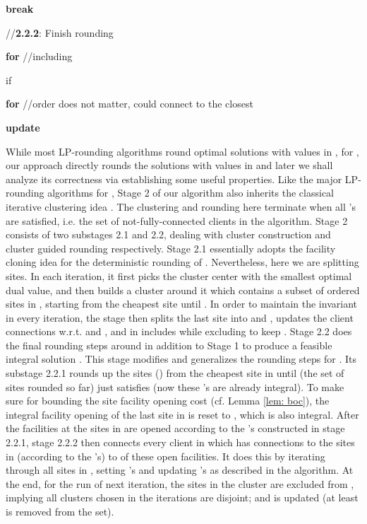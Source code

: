 \documentclass[10pt]{llncs}
\begin{document}
\begin{algorithm}[H]
\qquad{}\qquad{}\qquad{}\textbf{break}\medskip{}


\qquad{}//\textbf{2.2.2}: Finish rounding 

\qquad{}\textbf{for}  //including 

\qquad{}\qquad{}if 

\qquad{}\qquad{}\qquad{}\textbf{for  }//order
does not matter, could connect to the closest

\qquad{}\qquad{}\qquad{}\qquad{}

\qquad{}\qquad{}\qquad{}\qquad{}

\qquad{}\qquad{}

\qquad{}\textbf{update }
\end{algorithm}


While most LP-rounding algorithms round optimal solutions with values
in , for , our approach directly rounds
the solutions with values in  and later
we shall analyze its correctness via establishing some useful properties.
Like the major LP-rounding algorithms \cite{Sviridenko02improved1.58,jaroslaw2010optimal,jaroslaw2012lp,Li2011}
for , Stage 2 of our algorithm also inherits the classical iterative
clustering idea \cite{Shmoys97FL,Chudak0312e}. The clustering and
rounding here terminate when all 's are satisfied, i.e.
the set of not-fully-connected clients 
in the algorithm. Stage 2 consists of two substages 2.1 and 2.2, dealing
with cluster construction and cluster guided rounding respectively.
Stage 2.1 essentially adopts the facility cloning idea \cite{Swamy08FTFL2.076}
for the deterministic rounding of . Nevertheless, here we are
splitting sites. In each iteration, it first picks the cluster center
 with the smallest optimal dual value, and then builds a cluster
 around it which contains a subset of ordered sites
in , starting from the cheapest site until .
In order to maintain the invariant 
in every iteration, the stage then splits the last site 
into  and , updates the client connections w.r.t.
 and , and in  includes  while
excluding  to keep .
Stage 2.2 does the final rounding steps around  in addition
to Stage 1 to produce a feasible integral solution .
This stage modifies and generalizes the rounding steps for .
Its substage 2.2.1 rounds up the sites ()
from the cheapest site in  until 
(the set of sites rounded so far) just satisfies \textbf{}
(now these 's are already integral). To make sure 
for bounding the site facility opening cost (cf. Lemma \ref{lem: boc}),
the integral facility opening  of the last site  in 
is reset to ,
which is also integral. After the facilities at the sites in 
are opened according to the 's constructed in stage 2.2.1,
stage 2.2.2 then connects every client  in 
which has connections to the sites in  (according to
the 's) to 
of these open facilities. It does this by iterating through all sites
in , setting 's and updating 's
as described in the algorithm. At the end, for the run of next iteration,
the sites in the cluster  are excluded from ,
implying all clusters chosen in the iterations are disjoint; and 
is updated (at least  is removed from the set). 
\end{document}
